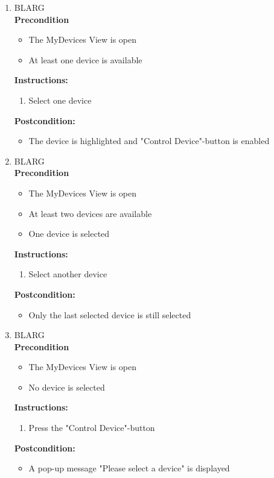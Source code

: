 \documentclass[a4paper]{article}
\newlength{\testlabellength}
\newenvironment{testlist}{\begin{enumerate}[label=\bfseries Instruction \thesubsection.\arabic* , labelindent=0pt, labelwidth=\testlabellength , leftmargin=2cm]}{\end{enumerate}}
\newenvironment{precondition}{
{\color{white}BLARG}\\ 
\textbf{Precondition}
\begin{itemize}[labelindent=0cm, labelwidth=2cm , leftmargin=1cm]
}
{\end{itemize}}
\newenvironment{instruction}{
\textbf{Instructions:}
\begin{enumerate}[label=\bfseries  \arabic*., labelindent=0cm, labelwidth=2cm , leftmargin=1cm]
}
{\end{enumerate}}
\newenvironment{postcondition}{
\textbf{Postcondition:}
\begin{itemize}[labelindent=0cm, labelwidth=2cm , leftmargin=1cm]
}
{\end{itemize}}
\begin{document}
\begin{appendices}
\begin{testlist}
    \item
     	\begin{precondition}
    		\item The MyDevices View is open
    		\item At least one device is available
    	\end{precondition}
		\begin{instruction}
			\item Select one device
		\end{instruction}
		\begin{postcondition}
			\item The device is highlighted and "Control Device"-button is enabled
		\end{postcondition}
   
    \item 
   		\begin{precondition}
   			\item The MyDevices View is open
   			\item At least two devices are available
   			\item One device is selected
   		\end{precondition}
   		\begin{instruction}
   			\item Select another device
   		\end{instruction}
   		\begin{postcondition}
   			\item Only the last selected device is still selected
   		\end{postcondition}
    
    \item
    	\begin{precondition}
    		\item The MyDevices View is open
    		\item No device is selected
    	\end{precondition}
    	\begin{instruction}
    		\item Press the "Control Device"-button
    	\end{instruction}
    	\begin{postcondition}
    		\item A pop-up message "Please select a device" is displayed
    	\end{postcondition}
   

\end{testlist}
\end{appendices}
\end{document}

